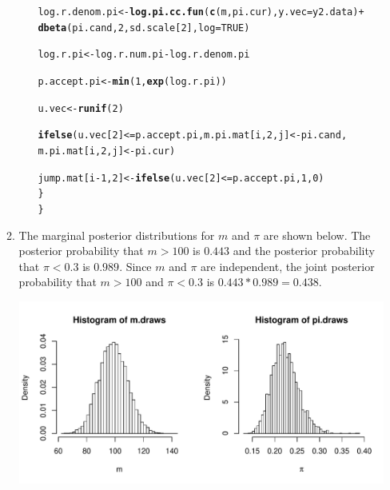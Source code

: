 \documentclass[12pt]{article}\usepackage[]{graphicx}\usepackage[]{color}
\makeatletter
\newcommand{\hlnum}[1]{\textcolor[rgb]{0.686,0.059,0.569}{#1}}%
\newcommand{\hlopt}[1]{\textcolor[rgb]{0,0,0}{#1}}%
\newcommand{\hlstd}[1]{\textcolor[rgb]{0.345,0.345,0.345}{#1}}%
\newcommand{\hlkwb}[1]{\textcolor[rgb]{0.69,0.353,0.396}{#1}}%
\newcommand{\hlkwc}[1]{\textcolor[rgb]{0.333,0.667,0.333}{#1}}%
\newcommand{\hlkwd}[1]{\textcolor[rgb]{0.737,0.353,0.396}{\textbf{#1}}}%
\newenvironment{kframe}{%
 \def\at@end@of@kframe{}%
 \ifinner\ifhmode%
  \def\at@end@of@kframe{\end{minipage}}%
  \begin{minipage}{\columnwidth}%
 \fi\fi%
 \def\FrameCommand##1{\hskip\@totalleftmargin \hskip-\fboxsep
 \colorbox{shadecolor}{##1}\hskip-\fboxsep
     \hskip-\linewidth \hskip-\@totalleftmargin \hskip\columnwidth}%
 \MakeFramed {\advance\hsize-\width
   \@totalleftmargin\z@ \linewidth\hsize
   \@setminipage}}%
 {\par\unskip\endMakeFramed%
 \at@end@of@kframe}
\newenvironment{knitrout}{}{} %
\makeatother
\begin{document}
\begin{enumerate}
\begin{enumerate}
\begin{enumerate}
\begin{knitrout}
\begin{kframe}
\begin{alltt}
    \hlstd{log.r.denom.pi} \hlkwb{<-} \hlkwd{log.pi.cc.fun}\hlstd{(}\hlkwd{c}\hlstd{(m, pi.cur),} \hlkwc{y.vec} \hlstd{= y2.data)} \hlopt{+}
                       \hlkwd{dbeta}\hlstd{(pi.cand,} \hlnum{2}\hlstd{, sd.scale[}\hlnum{2}\hlstd{],} \hlkwc{log} \hlstd{=} \hlnum{TRUE}\hlstd{)}

    \hlstd{log.r.pi} \hlkwb{<-} \hlstd{log.r.num.pi} \hlopt{-} \hlstd{log.r.denom.pi}

    \hlstd{p.accept.pi} \hlkwb{<-} \hlkwd{min}\hlstd{(}\hlnum{1}\hlstd{,} \hlkwd{exp}\hlstd{(log.r.pi))}

    \hlstd{u.vec} \hlkwb{<-} \hlkwd{runif}\hlstd{(}\hlnum{2}\hlstd{)}

    \hlkwd{ifelse}\hlstd{(u.vec[}\hlnum{2}\hlstd{]} \hlopt{<=} \hlstd{p.accept.pi, m.pi.mat[i,} \hlnum{2}\hlstd{, j]} \hlkwb{<-} \hlstd{pi.cand,}
           \hlstd{m.pi.mat[i,} \hlnum{2}\hlstd{, j]} \hlkwb{<-} \hlstd{pi.cur)}

    \hlstd{jump.mat[i}\hlopt{-}\hlnum{1}\hlstd{,} \hlnum{2}\hlstd{]} \hlkwb{<-} \hlkwd{ifelse}\hlstd{(u.vec[}\hlnum{2}\hlstd{]} \hlopt{<=} \hlstd{p.accept.pi,} \hlnum{1}\hlstd{,} \hlnum{0}\hlstd{)}
  \hlstd{\}}
\hlstd{\}}
\end{alltt}
\end{kframe}
\end{knitrout}



\end{enumerate}

\item The marginal posterior distributions for $m$ and $\pi$ are shown below. The posterior probability that $m>100$ is $0.443$ and the posterior probability that $\pi < 0.3$ is $0.989$. Since $m$ and $\pi$ are independent, the joint posterior probability that $m > 100$ and $\pi < 0.3$ is $0.443*0.989 = 0.438$.

\begin{knitrout}\footnotesize
{}\color{fgcolor}
\includegraphics[width=\linewidth]{figure/converdiags-1} 


\end{knitrout}
\end{enumerate}
\end{enumerate}
\end{document}
